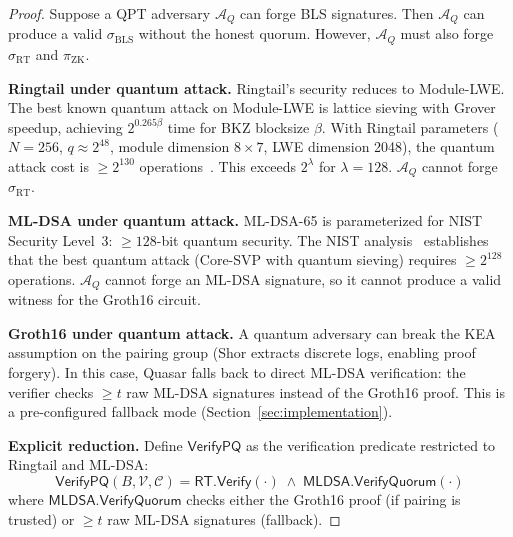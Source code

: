 \begin{proof}
Suppose a QPT adversary $\mathcal{A}_Q$ can forge BLS signatures.
Then $\mathcal{A}_Q$ can produce a valid $\sigma_{\mathrm{BLS}}$
without the honest quorum.  However, $\mathcal{A}_Q$ must also forge
$\sigma_{\mathrm{RT}}$ and $\pi_{\mathrm{ZK}}$.

\medskip
\textbf{Ringtail under quantum attack.}
Ringtail's security reduces to Module-LWE.  The best known quantum
attack on Module-LWE is lattice sieving with Grover speedup, achieving
$2^{0.265\beta}$ time for BKZ blocksize $\beta$.  With Ringtail
parameters ($N = 256$, $q \approx 2^{48}$, module dimension
$8 \times 7$, LWE dimension 2048), the quantum attack cost is
$\geq 2^{130}$ operations~\cite{ringtail}.  This exceeds $2^{\lambda}$
for $\lambda = 128$.  $\mathcal{A}_Q$ cannot forge
$\sigma_{\mathrm{RT}}$.

\medskip
\textbf{ML-DSA under quantum attack.}
ML-DSA-65 is parameterized for NIST Security Level~3: $\geq 128$-bit
quantum security.  The NIST analysis~\cite{nist-pqc} establishes that
the best quantum attack (Core-SVP with quantum sieving) requires
$\geq 2^{128}$ operations.  $\mathcal{A}_Q$ cannot forge an ML-DSA
signature, so it cannot produce a valid witness for the Groth16 circuit.

\medskip
\textbf{Groth16 under quantum attack.}
A quantum adversary can break the KEA assumption on the pairing group
(Shor extracts discrete logs, enabling proof forgery).  In this case,
Quasar falls back to direct ML-DSA verification: the verifier checks
$\geq t$ raw ML-DSA signatures instead of the Groth16 proof.  This is
a pre-configured fallback mode (Section~\ref{sec:implementation}).

\medskip
\textbf{Explicit reduction.}
Define $\mathsf{VerifyPQ}$ as the verification predicate restricted to
Ringtail and ML-DSA:
\[
  \mathsf{VerifyPQ}(B, \mathcal{V}, \mathcal{C}) =
  \mathsf{RT.Verify}(\cdot) \;\land\;
  \mathsf{MLDSA.VerifyQuorum}(\cdot)
\]
where $\mathsf{MLDSA.VerifyQuorum}$ checks either the Groth16 proof
(if pairing is trusted) or $\geq t$ raw ML-DSA signatures (fallback).


\end{proof}
